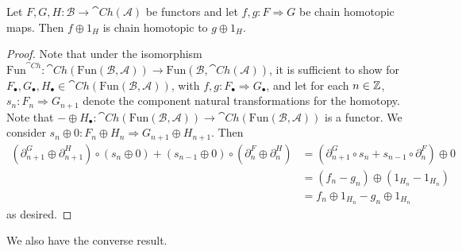 \begin{lem}[label=lem:oplusPres]
    Let $F,G,H:\mathcal{B}\to \cat{Ch}(\mathcal{A})$ be functors and let $f,g:F\Rightarrow G$ be chain homotopic maps. Then $f\oplus 1_H$ is chain homotopic to $g\oplus 1_H$.
\end{lem}
\begin{proof}
    Note that under the isomorphism $\text{Fun}^{\cat{Ch}}:\cat{Ch}(\text{Fun}(\mathcal{B},\mathcal{A}))\to \text{Fun}(\mathcal{B},\cat{Ch}(\mathcal{A}))$, it is sufficient to show for $F_\bullet,G_\bullet,H_\bullet \in \cat{Ch}(\text{Fun}(\mathcal{B},\mathcal{A}))$, with $f,g:F_\bullet\Rightarrow G_\bullet$, and let for each $n \in \mathbb Z$, $s_n:F_n\Rightarrow G_{n+1}$ denote the component natural transformations for the homotopy. Note that $-\oplus H_\bullet:\cat{Ch}(\text{Fun}(\mathcal{B},\mathcal{A}))\to \cat{Ch}(\text{Fun}(\mathcal{B},\mathcal{A}))$ is a functor. We consider $s_n\oplus 0:F_n\oplus H_n\Rightarrow G_{n+1}\oplus H_{n+1}$. Then 
    \begin{align*}
        (\partial_{n+1}^G\oplus \partial_{n+1}^H)\circ (s_n\oplus 0)+(s_{n-1}\oplus 0)\circ (\partial_n^F\oplus \partial_n^H) &= (\partial_{n+1}^G\circ s_n+s_{n-1}\circ \partial_n^F)\oplus 0  \\
        &= (f_n-g_n)\oplus (1_{H_n}-1_{H_n}) \\
        &= f_n\oplus 1_{H_n}-g_n\oplus 1_{H_n}
    \end{align*}
    as desired.
\end{proof}

We also have the converse result.

